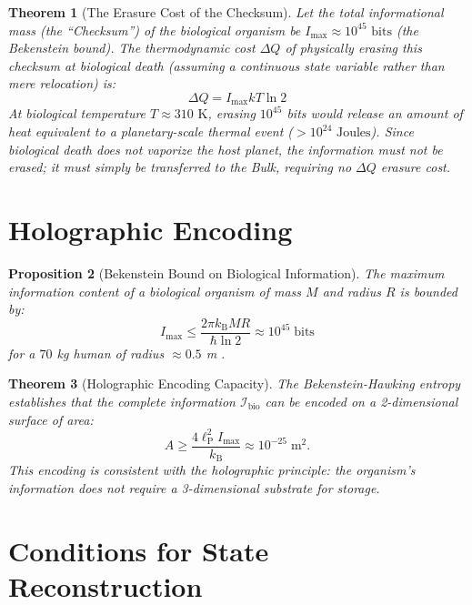 \documentclass[12pt, a4paper]{article}
\theoremstyle{plain}
\newtheorem{theorem}{Theorem}[section]
\newtheorem{proposition}[theorem]{Proposition}
\theoremstyle{definition}
\theoremstyle{remark}
\newcommand{\kB}{k_{\mathrm{B}}}
\newcommand{\lP}{\ell_{\mathrm{P}}}
\begin{document}
\begin{theorem}[The Erasure Cost of the Checksum]\label{thm:landauer}
Let the total informational mass (the ``Checksum'') of the biological organism be $I_{\max} \approx 10^{45} \text{ bits}$ (the Bekenstein bound). The thermodynamic cost $\Delta Q$ of physically erasing this checksum at biological death (assuming a continuous state variable rather than mere relocation) is:
\begin{equation}
    \Delta Q = I_{\max} kT \ln 2
\end{equation}
At biological temperature $T \approx 310 \text{ K}$, erasing $10^{45}$ bits would release an amount of heat equivalent to a planetary-scale thermal event ($> 10^{24} \text{ Joules}$). Since biological death does not vaporize the host planet, the information \emph{must not be erased}; it must simply be transferred to the Bulk, requiring no $\Delta Q$ erasure cost.
\end{theorem}

\section{Holographic Encoding}\label{sec:encoding}

\begin{proposition}[Bekenstein Bound on Biological Information]\label{prop:bekenstein}
  The maximum information content of a biological organism of mass $M$
  and radius $R$ is bounded by:
  \begin{equation}\label{eq:bekenstein}
    I_{\max} \leq \frac{2\pi \kB M R}{\hbar \ln 2} \approx 10^{45}
    \; \text{bits}
  \end{equation}
  for a $70$ kg human of radius $\approx 0.5$ m \citep{Bekenstein1981}.
\end{proposition}

\begin{theorem}[Holographic Encoding Capacity]\label{thm:holographic}
  The Bekenstein-Hawking entropy establishes that the complete information
  $\mathcal{I}_{\text{bio}}$ can be encoded on a 2-dimensional surface
  of area:
  \begin{equation}
    A \geq \frac{4 \lP^2 I_{\max}}{\kB} \approx 10^{-25} \; \text{m}^2.
  \end{equation}
  This encoding is consistent with the holographic principle: the
  organism's information does not require a 3-dimensional substrate for
  storage.
\end{theorem}

\section{Conditions for State Reconstruction}\label{sec:reconstruction}
\end{document}
